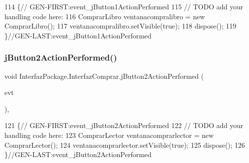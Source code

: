 \begin{DoxyCode}
114                                                                          \{\textcolor{comment}{//
      GEN-FIRST:event\_jButton1ActionPerformed}
115         \textcolor{comment}{// TODO add your handling code here:}
116         ComprarLibro ventanacompralibro = \textcolor{keyword}{new} ComprarLibro();
117         ventanacompralibro.setVisible(\textcolor{keyword}{true});
118         dispose();
119     \}\textcolor{comment}{//GEN-LAST:event\_jButton1ActionPerformed}
\end{DoxyCode}
\mbox{\label{class_interfaz_package_1_1_interfaz_comprar_addcea73314639a2e954a8993777bc6c6}} 
\subsubsection{\texorpdfstring{j\+Button2\+Action\+Performed()}{jButton2ActionPerformed()}}
{\footnotesize\ttfamily void Interfaz\+Package.\+Interfaz\+Comprar.\+j\+Button2\+Action\+Performed (\begin{DoxyParamCaption}\item[{java.\+awt.\+event.\+Action\+Event}]{evt }\end{DoxyParamCaption})\hspace{0.3cm}{\ttfamily [inline]}, {\ttfamily [private]}}


\begin{DoxyCode}
121                                                                          \{\textcolor{comment}{//
      GEN-FIRST:event\_jButton2ActionPerformed}
122         \textcolor{comment}{// TODO add your handling code here:}
123         ComprarLector ventanacomprarlector = \textcolor{keyword}{new} ComprarLector();
124         ventanacomprarlector.setVisible(\textcolor{keyword}{true});
125         dispose();
126     \}\textcolor{comment}{//GEN-LAST:event\_jButton2ActionPerformed}
\end{DoxyCode}
\mbox{\label{class_interfaz_package_1_1_interfaz_comprar_a4cbb42295fa843c3ba653fbe9a43ab1e}} 
